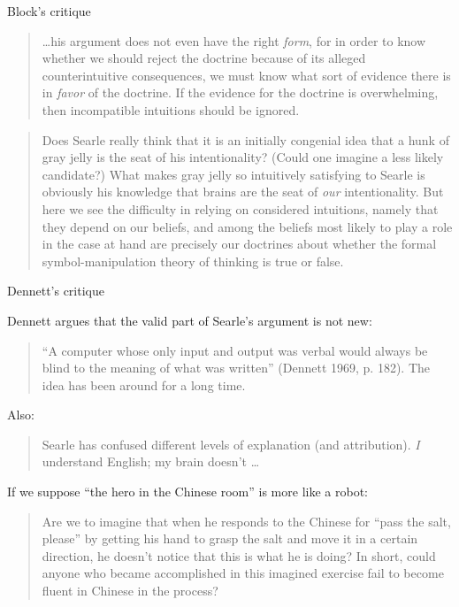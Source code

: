 \documentclass[10pt]{beamer}
\begin{document}
\begin{titledslide}{Block's critique}

  \begin{quote}
    \dots his argument does not even have the right \emph{form}, for
    in order to know whether we should reject the doctrine because of
    its alleged counterintuitive consequences, we must know what sort
    of evidence there is in \emph{favor} of the doctrine. If the
    evidence for the doctrine is overwhelming, then incompatible
    intuitions should be ignored.
  \end{quote}

  \begin{quote}
    Does Searle really think that it is an initially congenial idea
    that a hunk of gray jelly is the seat of his intentionality?
    (Could one imagine a less likely candidate?) What makes gray jelly
    so intuitively satisfying to Searle is obviously his knowledge
    that brains are the seat of \emph{our} intentionality. But here we see
    the difficulty in relying on considered intuitions, namely that
    they depend on our beliefs, and among the beliefs most likely to
    play a role in the case at hand are precisely our doctrines about
    whether the formal symbol-manipulation theory of thinking is true
    or false.
\end{quote}

\end{titledslide}
\begin{titledslide}{Dennett's critique}

  Dennett argues that the valid part of Searle's argument is not new:
  
  \begin{quote}
    ``A computer whose only input and output was verbal would always
    be blind to the meaning of what was written'' (Dennett 1969,
    p. 182). The idea has been around for a long time.
\end{quote}

Also:

\begin{quote}
  Searle has confused different levels of explanation (and
  attribution). \emph{I} understand English; my brain doesn't \dots
\end{quote}

If we suppose ``the hero in the Chinese room'' is more like a robot:
\begin{quote}
  Are we to imagine that when he responds to the Chinese for ``pass
  the salt, please'' by getting his hand to grasp the salt and move it
  in a certain direction, he doesn't notice that this is what he is
  doing? In short, could anyone who became accomplished in this
  imagined exercise fail to become fluent in Chinese in the process?
\end{quote}
\end{titledslide}
\end{document}

